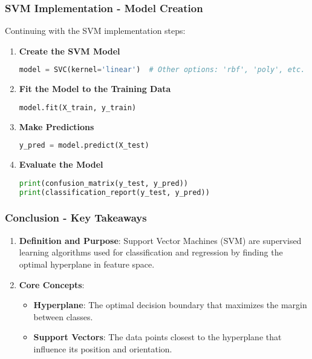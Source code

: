 \documentclass{beamer}
\begin{document}
\begin{frame}[fragile]
    \frametitle{SVM Implementation - Model Creation}
    Continuing with the SVM implementation steps:

    \begin{enumerate}[resume]
        \item \textbf{Create the SVM Model}
            \begin{lstlisting}[language=Python]
model = SVC(kernel='linear')  # Other options: 'rbf', 'poly', etc.
            \end{lstlisting}

        \item \textbf{Fit the Model to the Training Data}
            \begin{lstlisting}[language=Python]
model.fit(X_train, y_train)
            \end{lstlisting}

        \item \textbf{Make Predictions}
            \begin{lstlisting}[language=Python]
y_pred = model.predict(X_test)
            \end{lstlisting}

        \item \textbf{Evaluate the Model}
            \begin{lstlisting}[language=Python]
print(confusion_matrix(y_test, y_pred))
print(classification_report(y_test, y_pred))
            \end{lstlisting}
    \end{enumerate}
\end{frame}

\begin{frame}[fragile]
    \frametitle{Conclusion - Key Takeaways}
    
    \begin{enumerate}
        \item \textbf{Definition and Purpose}:
        Support Vector Machines (SVM) are supervised learning algorithms used for classification and regression by finding the optimal hyperplane in feature space.
        
        \item \textbf{Core Concepts}:
        \begin{itemize}
            \item \textbf{Hyperplane}: The optimal decision boundary that maximizes the margin between classes.
            \item \textbf{Support Vectors}: The data points closest to the hyperplane that influence its position and orientation.
        \end{itemize}
    \end{enumerate}
\end{frame}
\end{document}
